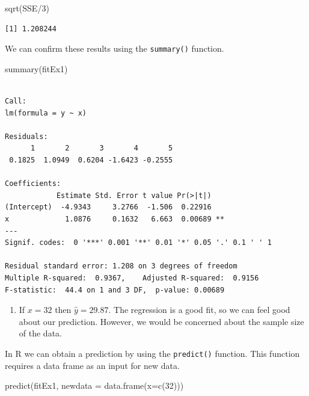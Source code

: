 \documentclass[
  letterpaper,
  DIV=11,
  numbers=noendperiod]{scrreprt}
\newenvironment{Shaded}{\begin{snugshade}}{\end{snugshade}}
\newcommand{\AttributeTok}[1]{\textcolor[rgb]{0.40,0.45,0.13}{#1}}
\newcommand{\DecValTok}[1]{\textcolor[rgb]{0.68,0.00,0.00}{#1}}
\newcommand{\FunctionTok}[1]{\textcolor[rgb]{0.28,0.35,0.67}{#1}}
\newcommand{\NormalTok}[1]{\textcolor[rgb]{0.00,0.23,0.31}{#1}}
\newcommand{\SpecialCharTok}[1]{\textcolor[rgb]{0.37,0.37,0.37}{#1}}
\providecommand{\tightlist}{%
  \setlength{\itemsep}{0pt}\setlength{\parskip}{0pt}}\usepackage{longtable,booktabs,array}
\begin{document}
\begin{Shaded}
\begin{Highlighting}[numbers=left,,]
\FunctionTok{sqrt}\NormalTok{(SSE}\SpecialCharTok{/}\DecValTok{3}\NormalTok{)}
\end{Highlighting}
\end{Shaded}

\begin{verbatim}
[1] 1.208244
\end{verbatim}

We can confirm these results using the \texttt{summary()} function.

\begin{Shaded}
\begin{Highlighting}[numbers=left,,]
\FunctionTok{summary}\NormalTok{(fitEx1)}
\end{Highlighting}
\end{Shaded}

\begin{verbatim}

Call:
lm(formula = y ~ x)

Residuals:
      1       2       3       4       5 
 0.1825  1.0949  0.6204 -1.6423 -0.2555 

Coefficients:
            Estimate Std. Error t value Pr(>|t|)   
(Intercept)  -4.9343     3.2766  -1.506  0.22916   
x             1.0876     0.1632   6.663  0.00689 **
---
Signif. codes:  0 '***' 0.001 '**' 0.01 '*' 0.05 '.' 0.1 ' ' 1

Residual standard error: 1.208 on 3 degrees of freedom
Multiple R-squared:  0.9367,    Adjusted R-squared:  0.9156 
F-statistic:  44.4 on 1 and 3 DF,  p-value: 0.00689
\end{verbatim}

\begin{enumerate}
\def\labelenumi{\arabic{enumi}.}
\setcounter{enumi}{2}
\tightlist
\item
  If \(x=32\) then \(\hat{y}=29.87\). The regression is a good fit, so
  we can feel good about our prediction. However, we would be concerned
  about the sample size of the data.
\end{enumerate}

In R we can obtain a prediction by using the \texttt{predict()}
function. This function requires a data frame as an input for new data.

\begin{Shaded}
\begin{Highlighting}[numbers=left,,]
\FunctionTok{predict}\NormalTok{(fitEx1, }\AttributeTok{newdata =} \FunctionTok{data.frame}\NormalTok{(}\AttributeTok{x=}\FunctionTok{c}\NormalTok{(}\DecValTok{32}\NormalTok{)))}
\end{Highlighting}
\end{Shaded}
\end{document}
